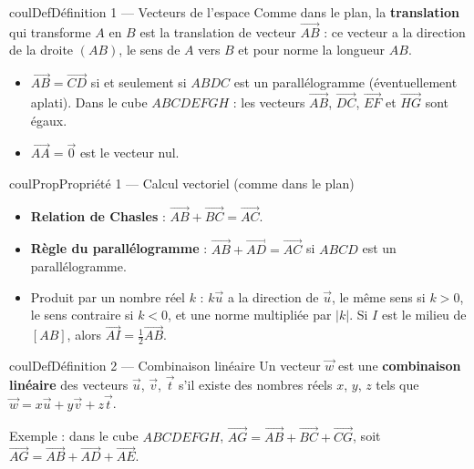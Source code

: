 \documentclass[11pt,a4paper]{article}
\makeatletter
\newcommand{\vect}[1]{\overrightarrow{#1}}
\newcounter{lycee@signet}
\newcommand{\signet}[3][]{\stepcounter{lycee@signet}%
  \edef\lycee@dest{\if\relax\detokenize{#1}\relax
    signet.\arabic{lycee@signet}\else#1\fi}%
  \hypertarget{\lycee@dest}{}\bookmark[level=#2,dest=\lycee@dest]{#3}}
\newenvironment{definitionbox}[1][Définition]%
  {\begin{boitecours}[phantom={\signet{2}{#1}}]{coulDef}{#1}}{\end{boitecours}}
\newenvironment{proprietebox}[1][Propriété]%
  {\begin{boitecours}[phantom={\signet{2}{#1}}]{coulProp}{#1}}{\end{boitecours}}
\makeatother
\begin{document}
\begin{definitionbox}[Définition 1 --- Vecteurs de l'espace]
Comme dans le plan, la \textbf{translation} qui transforme $A$ en $B$ est la translation
de vecteur $\vect{AB}$ : ce vecteur a la direction de la droite $(AB)$, le sens de $A$
vers $B$ et pour norme la longueur $AB$.
\begin{itemize}
  \item $\vect{AB}=\vect{CD}$ si et seulement si $ABDC$ est un parallélogramme
        (éventuellement aplati). Dans le cube $ABCDEFGH$ :
        les vecteurs $\vect{AB}$, $\vect{DC}$, $\vect{EF}$ et $\vect{HG}$ sont égaux.
  \item $\vect{AA}=\vect{0}$ est le vecteur nul.
\end{itemize}
\end{definitionbox}

\begin{proprietebox}[Propriété 1 --- Calcul vectoriel (comme dans le plan)]
\begin{itemize}
  \item \textbf{Relation de Chasles} : $\vect{AB}+\vect{BC}=\vect{AC}$.
  \item \textbf{Règle du parallélogramme} : $\vect{AB}+\vect{AD}=\vect{AC}$ si $ABCD$
        est un parallélogramme.\par
  \item Produit par un nombre réel $k$ : $k\vect{u}$ a la direction de $\vect{u}$, le
        même sens si $k>0$, le sens contraire si $k<0$, et une norme multipliée par
        $|k|$. Si $I$ est le milieu de $[AB]$, alors $\vect{AI}=\frac{1}{2}\vect{AB}$.
\end{itemize}
\end{proprietebox}

\begin{definitionbox}[Définition 2 --- Combinaison linéaire]
Un vecteur $\vect{w}$ est une \textbf{combinaison linéaire} des vecteurs $\vect{u}$,
$\vect{v}$, $\vect{t}$ s'il existe des nombres réels $x$, $y$, $z$ tels que
$\vect{w}=x\vect{u}+y\vect{v}+z\vect{t}$.

Exemple : dans le cube $ABCDEFGH$, $\vect{AG}=\vect{AB}+\vect{BC}+\vect{CG}$, soit
$\vect{AG}=\vect{AB}+\vect{AD}+\vect{AE}$.
\end{definitionbox}
\end{document}
